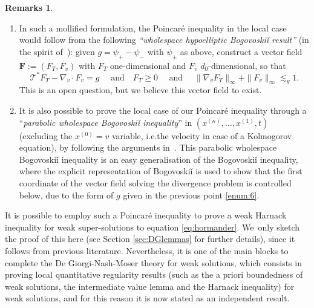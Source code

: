 \documentclass[10pt,a4paper]{amsart}
\providecommand{\ie}{i.e.}
\theoremstyle{definition}
\newtheorem{remarks}[theorem]{Remarks}
\newcommand{\cT}{{\mathcal T}}
\renewcommand{\vec}[1]{\boldsymbol{#1}}
\begin{document}
\begin{remarks}
\begin{enumerate}
\item\label{enum:6} In such a mollified formulation, the Poincaré inequality
in the local case would follow from the following
\textit{``wholespace hypoelliptic Bogovoskiǐ result''} (in the spirit
of~\cite{MR553920}): given $g=\psi_+-\psi_-$ with $\psi_\pm$
as above, construct a vector field $\vec{F}:= (F_T,F_{v})$
with $F_T$ one-dimensional and $F_{v}$ $d_0$-dimensional,
so that\vspace*{-3pt}
\begin{equation*}
\cT^* F_T - \nabla_{v} \cdot F_{v} = g \quad \text{ and
} \quad F_T \ge 0 \quad \text{ and } \quad \| \nabla_{v}
F_T \|_\infty + \| F_{v} \|_\infty \lesssim_g 1.
\end{equation*}
This is an open question, but we believe this vector field to
exist.

\item It is also possible to prove the local case of our
Poincaré inequality through a ``\emph{parabolic wholespace
Bogovoskiǐ inequality}'' in
$(x^{(\kappa)},\dots,x^{(1)}, t)$ (excluding the $x^{(0)}=v$
variable, \ie the velocity in case of a Kolmogorov
equation), by following the arguments
in~\cite{dietert2023quantitative}. This parabolic wholespace
Bogovoskiǐ inequality is an easy generalisation of the
Bogovoskiǐ inequality, where the explicit representation of
Bogovoskiǐ is used to show that the first coordinate of the
vector field solving the divergence problem is controlled
below, due to the form of $g$ given in the previous point \eqref{enum:6}.
\end{enumerate}
\end{remarks}

It is possible to employ such a Poincaré inequality to prove a weak Harnack inequality
for weak super-solutions to equation \eqref{eq:hormander}. We~only sketch the proof of this here (see Section \ref{sec:DGlemmas} for further details), since it follows from previous literature. Nevertheless,
it is one of the main blocks to complete the De Giorgi-Nash-Moser theory for weak solutions, which
consists in proving local quantitative regularity results (such as the a priori boundedness of weak solutions, the intermediate value lemma and
the Harnack inequality) for weak solutions, and for this reason it is now stated as an independent result.
\end{document}
